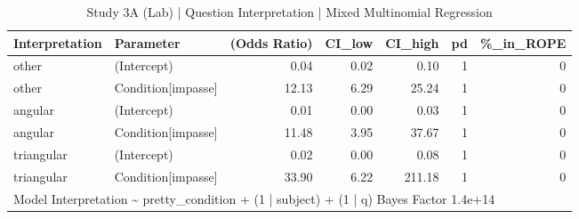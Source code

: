 \begin{table}

\caption{Study 3A (Lab) | Question Interpretation | Mixed Multinomial Regression}
\centering
\begin{tabular}[t]{l|l|r|r|r|r|r}
\hline
Interpretation & Parameter & (Odds Ratio) & CI\_low & CI\_high & pd & \%\_in\_ROPE\\
\hline
other & (Intercept) & 0.04 & 0.02 & 0.10 & 1 & 0\\
\hline
other & Condition[impasse] & 12.13 & 6.29 & 25.24 & 1 & 0\\
\hline
angular & (Intercept) & 0.01 & 0.00 & 0.03 & 1 & 0\\
\hline
angular & Condition[impasse] & 11.48 & 3.95 & 37.67 & 1 & 0\\
\hline
triangular & (Intercept) & 0.02 & 0.00 & 0.08 & 1 & 0\\
\hline
triangular & Condition[impasse] & 33.90 & 6.22 & 211.18 & 1 & 0\\
\hline
\multicolumn{7}{l}{\rule{0pt}{1em}Model Interpretation \textasciitilde{}  pretty\_condition + (1 | subject) + (1 | q) Bayes Factor  1.4e+14}\\
\end{tabular}
\end{table}
